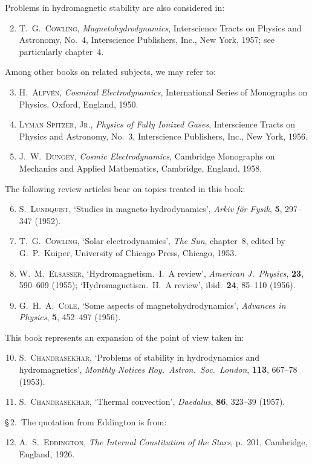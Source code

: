 \noindent
Problems in hydromagnetic stability are also considered in:

\begin{enumerate}\setcounter{enumi}{1}
\item T.~G.~\textsc{Cowling}, \emph{Magnetohydrodynamics}, Interscience Tracts on Physics
  and Astronomy, No.~4, Interscience Publishers, Inc., New York, 1957;
  see particularly chapter~4.
\end{enumerate}

\noindent
Among other books on related subjects, we may refer to:

\begin{enumerate}\setcounter{enumi}{2}
\item H.~\textsc{Alfv\'en}, \emph{Cosmical Electrodynamics}, International Series of Monographs
  on Physics, Oxford, England, 1950.
\item \textsc{Lyman Spitzer, Jr.}, \emph{Physics of Fully Ionized Gases}, Interscience Tracts
  on Physics and Astronomy, No.~3, Interscience Publishers, Inc., New York,
  1956.
\item J.~W.~\textsc{Dungey}, \emph{Cosmic Electrodynamics}, Cambridge Monographs on
  Mechanics and Applied Mathematics, Cambridge, England, 1958.
\end{enumerate}

\noindent
The following review articles bear on topics treated in this book:

\begin{enumerate}\setcounter{enumi}{5}
\item S.~\textsc{Lundquist}, `Studies in magneto-hydrodynamics', \emph{Arkiv f\"or Fysik}, \textbf{5},
  297--347 (1952).
\item T.~G.~\textsc{Cowling}, `Solar electrodynamics', \emph{The Sun}, chapter~8, edited by
  G.~P.~Kuiper, University of Chicago Press, Chicago, 1953.
\item W.~M.~\textsc{Elsasser}, `Hydromagnetism.\ I.\ A review', \emph{American J.\ Physics},
  \textbf{23}, 590--609 (1955); `Hydromagnetism.\ II.\ A review', ibid.\ \textbf{24}, 85--110
  (1956).
\item G.~H.~A.~\textsc{Cole}, `Some aspects of magnetohydrodynamics', \emph{Advances in
  Physics}, \textbf{5}, 452--497 (1956).
\end{enumerate}

\noindent
This book represents an expansion of the point of view taken in:

\begin{enumerate}\setcounter{enumi}{9}
\item S.~\textsc{Chandrasekhar}, `Problems of stability in hydrodynamics and hydromagnetics', \emph{Monthly Notices Roy.\ Astron.\ Soc.\ London}, \textbf{113}, 667--78 (1953).
\item S.~\textsc{Chandrasekhar}, `Thermal convection', \emph{Daedalus}, \textbf{86}, 323--39 (1957).
\end{enumerate}

\noindent
\S\,2.\ The quotation from Eddington is from:

\begin{enumerate}\setcounter{enumi}{11}
\item A.~S.~\textsc{Eddington}, \emph{The Internal Constitution of the Stars}, p.~201, Cambridge,
  England, 1926.
\end{enumerate}
